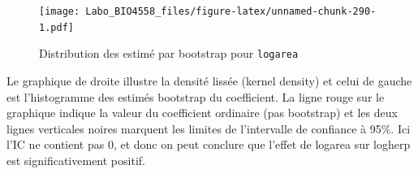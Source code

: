 \documentclass[
  12pt,
]{book}
\newenvironment{Shaded}{\begin{snugshade}}{\end{snugshade}}
\newcommand{\CommentTok}[1]{\textcolor[rgb]{0.56,0.35,0.01}{\textit{#1}}}
\newcommand{\ControlFlowTok}[1]{\textcolor[rgb]{0.13,0.29,0.53}{\textbf{#1}}}
\newcommand{\DataTypeTok}[1]{\textcolor[rgb]{0.13,0.29,0.53}{#1}}
\newcommand{\DecValTok}[1]{\textcolor[rgb]{0.00,0.00,0.81}{#1}}
\newcommand{\FloatTok}[1]{\textcolor[rgb]{0.00,0.00,0.81}{#1}}
\newcommand{\KeywordTok}[1]{\textcolor[rgb]{0.13,0.29,0.53}{\textbf{#1}}}
\newcommand{\NormalTok}[1]{#1}
\newcommand{\OperatorTok}[1]{\textcolor[rgb]{0.81,0.36,0.00}{\textbf{#1}}}
\newcommand{\OtherTok}[1]{\textcolor[rgb]{0.56,0.35,0.01}{#1}}
\newcommand{\StringTok}[1]{\textcolor[rgb]{0.31,0.60,0.02}{#1}}
\begin{document}
\begin{Shaded}
\end{Shaded}

\begin{figure}
\centering
\texttt{[image: Labo\_BIO4558\_files/figure-latex/unnamed-chunk-290-1.pdf]}
\caption{\label{fig:unnamed-chunk-290}Distribution des estimé par bootstrap pour \texttt{logarea}}
\end{figure}

Le graphique de droite illustre la densité lissée (kernel density) et celui de gauche est l'histogramme des estimés bootstrap du coefficient. La ligne rouge sur le graphique indique la valeur du coefficient ordinaire (pas bootstrap) et les deux lignes verticales noires marquent les limites de l'intervalle de confiance à 95\%. Ici l'IC ne contient pas 0, et donc on peut conclure que l'effet de logarea sur logherp est significativement positif.
\end{document}
